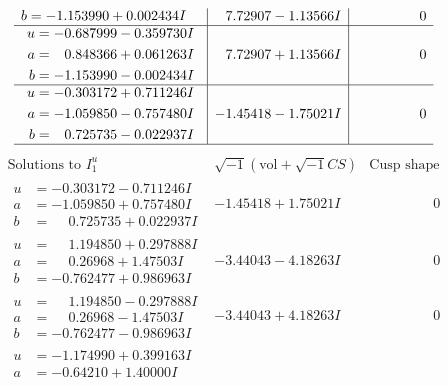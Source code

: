 \documentclass[1p]{elsarticle_modified}
\theoremstyle{definition}
\newcommand{\I}{\sqrt{-1}}
\begin{document}
$$\begin{array}{c|c|c}
\begin{aligned}
b &= -1.153990 + 0.002434 I\end{aligned}
 & \phantom{-}7.72907 - 1.13566 I & \phantom{-0.000000 } 0 \\ \hline\begin{aligned}
u &= -0.687999 - 0.359730 I \\
a &= \phantom{-}0.848366 + 0.061263 I \\
b &= -1.153990 - 0.002434 I\end{aligned}
 & \phantom{-}7.72907 + 1.13566 I & \phantom{-0.000000 } 0 \\ \hline\begin{aligned}
u &= -0.303172 + 0.711246 I \\
a &= -1.059850 - 0.757480 I \\
b &= \phantom{-}0.725735 - 0.022937 I\end{aligned}
 & -1.45418 - 1.75021 I & \phantom{-0.000000 } 0\\
 \hline 
 \end{array}$$\newpage$$\begin{array}{c|c|c}  
\text{Solutions to }I^u_{1}& \I (\text{vol} + \sqrt{-1}CS) & \text{Cusp shape}\\
 \hline 
\begin{aligned}
u &= -0.303172 - 0.711246 I \\
a &= -1.059850 + 0.757480 I \\
b &= \phantom{-}0.725735 + 0.022937 I\end{aligned}
 & -1.45418 + 1.75021 I & \phantom{-0.000000 } 0 \\ \hline\begin{aligned}
u &= \phantom{-}1.194850 + 0.297888 I \\
a &= \phantom{-}0.26968 + 1.47503 I \\
b &= -0.762477 + 0.986963 I\end{aligned}
 & -3.44043 - 4.18263 I & \phantom{-0.000000 } 0 \\ \hline\begin{aligned}
u &= \phantom{-}1.194850 - 0.297888 I \\
a &= \phantom{-}0.26968 - 1.47503 I \\
b &= -0.762477 - 0.986963 I\end{aligned}
 & -3.44043 + 4.18263 I & \phantom{-0.000000 } 0 \\ \hline\begin{aligned}
u &= -1.174990 + 0.399163 I \\
a &= -0.64210 + 1.40000 I \\

\end{aligned}
\end{array}$$
\end{document}
